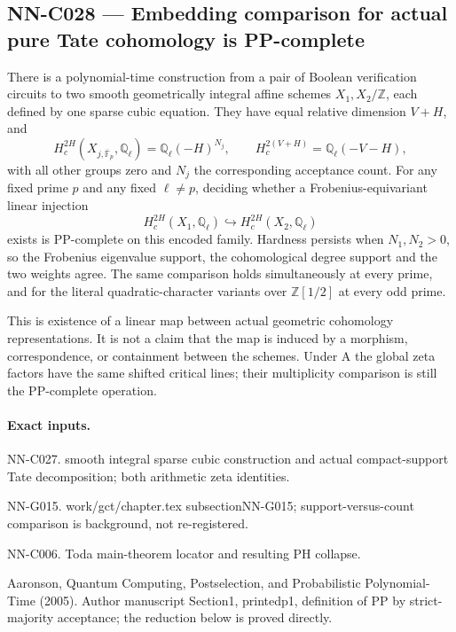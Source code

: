 \subsection{NN-C028 --- Embedding comparison for actual pure Tate cohomology is PP-complete}
\begin{proposition}[NN-C028]
There is a polynomial-time construction from a pair of Boolean verification circuits to two smooth geometrically integral affine schemes $X_1,X_2/\mathbb Z$, each defined by one sparse cubic equation. They have equal relative dimension $V+H$, and
\[
 H_c^{2H}(X_{j,\overline{\mathbb F}_p},\mathbb Q_\ell)
          =\mathbb Q_\ell(-H)^{N_j},\qquad
 H_c^{2(V+H)}=\mathbb Q_\ell(-V-H),
\]
with all other groups zero and $N_j$ the corresponding acceptance count. For any fixed prime $p$ and any fixed $\ell\ne p$, deciding whether a Frobenius-equivariant linear injection
\[
 H_c^{2H}(X_1,\mathbb Q_\ell)
       \hookrightarrow H_c^{2H}(X_2,\mathbb Q_\ell)
\]
exists is PP-complete on this encoded family. Hardness persists when $N_1,N_2>0$, so the Frobenius eigenvalue support, the cohomological degree support and the two weights agree. The same comparison holds simultaneously at every prime, and for the literal quadratic-character variants over $\mathbb Z[1/2]$ at every odd prime.

This is existence of a linear map between actual geometric cohomology representations. It is not a claim that the map is induced by a morphism, correspondence, or containment between the schemes. Under A the global zeta factors have the same shifted critical lines; their multiplicity comparison is still the PP-complete operation.
\end{proposition}
\paragraph{Exact inputs.}
NN-C027. smooth integral sparse cubic construction and actual compact-support Tate decomposition; both arithmetic zeta identities.

NN-G015. work/gct/chapter.tex subsectionNN-G015; support-versus-count comparison is background, not re-registered.

NN-C006. Toda main-theorem locator and resulting PH collapse.

Aaronson, Quantum Computing, Postselection, and Probabilistic Polynomial-Time (2005). Author manuscript Section1, printedp1, definition of PP by strict-majority acceptance; the reduction below is proved directly.

